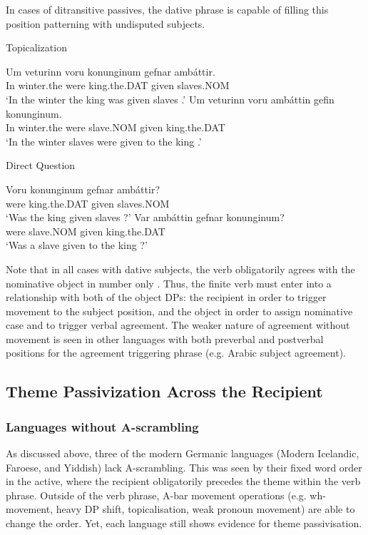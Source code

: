 In cases of ditransitive passives, the dative phrase is capable of filling this position patterning with undisputed subjects.

\begin{exe}
\ex Topicalization
\begin{xlist}
\ex \gll Um veturinn voru konunginum gefnar amb\'{a}ttir.\\
In winter.the were king.the.DAT given slaves.NOM\\
\trans `In the winter the king was given slaves \citep[ex. 47a]{Zaenen.1985}.'
\ex \gll Um veturinn voru amb\'{a}ttin gefin konunginum.\\
In winter.the were slave.NOM given king.the.DAT\\
\trans `In the winter slaves were given to the king \citep[ex. 47b]{Zaenen.1985}.'
\end{xlist}
\ex Direct Question
\begin{xlist}
\ex \gll Voru konunginum gefnar amb\'{a}ttir?\\
were king.the.DAT given slaves.NOM\\
\trans `Was the king given slaves \citep[ex. 48a]{Zaenen.1985}?'
\ex \gll Var amb\'{a}ttin gefnar konunginum?\\
were slave.NOM given king.the.DAT\\
\trans `Was a slave given to the king \citep[ex. 48b]{Zaenen.1985}?'
\end{xlist}
\end{exe}

Note that in all cases with dative subjects, the verb obligatorily agrees with the nominative object in number only \citep{Arnadottir.2013}. Thus, the finite verb must enter into a relationship with both of the object DPs: the recipient in order to trigger movement to the subject position, and the object in order to assign nominative case and to trigger verbal agreement. The weaker nature of agreement without movement is seen in other languages with both preverbal and postverbal positions for the agreement triggering phrase (e.g. Arabic subject agreement).

\subsection{Theme Passivization Across the Recipient}
\subsubsection{Languages without A-scrambling}
As discussed above, three of the modern Germanic languages (Modern Icelandic, Faroese, and Yiddish) lack A-scrambling. This was seen by their fixed word order in the active, where the recipient obligatorily precedes the theme within the verb phrase. Outside of the verb phrase, A-bar movement operations (e.g. wh-movement, heavy DP shift, topicalisation, weak pronoun movement) are able to change the order. Yet, each language still shows evidence for theme passivisation. 

